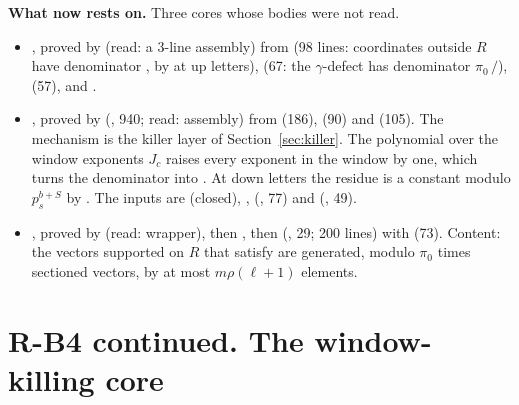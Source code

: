 \documentclass[11pt]{article}
\theoremstyle{definition}
\theoremstyle{remark}
\begin{document}
\noindent\textbf{What  now rests on.} Three cores whose bodies were not read.
\begin{itemize}[leftmargin=*,itemsep=1pt]
\item {}, proved by  (read: a 3-line assembly) from  (98 lines: coordinates outside $R$ have denominator , by  at up letters),  (67: the $\gamma$-defect has denominator $\pi_0\,$$/$),  (57), and .
\item {}, proved by  (, 940; read: assembly) from  (186),  (90) and  (105). The mechanism is the killer layer of Section~\ref{sec:killer}. The polynomial  over the window exponents $J_c$ raises every exponent in the window by one, which turns the denominator  into . At down letters the residue is a constant modulo $p_s^{b+S}$ by . The inputs are  (closed), ,  (, 77) and  (, 49).
\item {}, proved by  (read: wrapper), then , then  (, 29; 200 lines) with  (73). Content: the vectors supported on $R$ that satisfy  are generated, modulo $\pi_0$ times sectioned vectors, by at most $m\rho(\ell+1)$ elements.
\end{itemize}

\section{R-B4 continued. The window-killing core}\label{sec:killwin}
\end{document}
